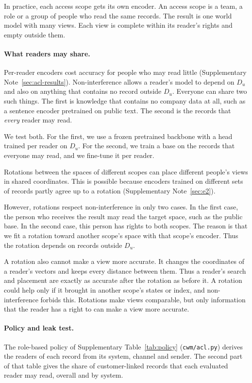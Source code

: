 \documentclass[11pt]{article}
\begin{document}
In practice, each access scope gets its own encoder. An access scope is a team, a role or a group of people who read the same records. The result is one world model with many views. Each view is complete within its reader's rights and empty outside them.

\paragraph{What readers may share.}
Per-reader encoders cost accuracy for people who may read little (Supplementary Note~\ref{sec:acl-results}). Non-interference allows a reader's model to depend on $D_u$ and also on anything that contains no record outside $D_u$. Everyone can share two such things. The first is knowledge that contains no company data at all, such as a sentence encoder pretrained on public text. The second is the records that \emph{every} reader may read.

We test both. For the first, we use a frozen pretrained backbone with a head trained per reader on $D_u$. For the second, we train a base on the records that everyone may read, and we fine-tune it per reader.

Rotations between the spaces of different scopes can place different people's views in shared coordinates. This is possible because encoders trained on different sets of records partly agree up to a rotation (Supplementary Note~\ref{sec:e2}).

However, rotations respect non-interference in only two cases. In the first case, the person who receives the result may read the target space, such as the public base. In the second case, this person has rights to both scopes. The reason is that we fit a rotation toward another scope's space with that scope's encoder. Thus the rotation depends on records outside $D_u$.

A rotation also cannot make a view more accurate. It changes the coordinates of a reader's vectors and keeps every distance between them. Thus a reader's search and placement are exactly as accurate after the rotation as before it. A rotation could help only if it brought in another scope's states or index, and non-interference forbids this. Rotations make views comparable, but only information that the reader has a right to can make a view more accurate.

\paragraph{Policy and leak test.}
The role-based policy of Supplementary Table~\ref{tab:policy} (\texttt{cwm/acl.py}) derives the readers of each record from its system, channel and sender. The second part of that table gives the share of customer-linked records that each evaluated reader may read, overall and by system.
\end{document}
